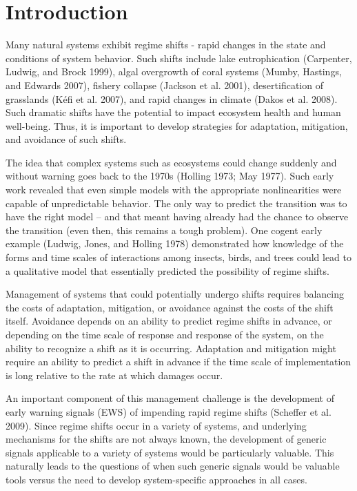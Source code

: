 \documentclass[author-year, review]{elsarticle} %
\begin{document}
\section{Introduction}

Many natural systems exhibit regime shifts - rapid changes in the state
and conditions of system behavior. Such shifts include lake
eutrophication (Carpenter, Ludwig, and Brock 1999), algal overgrowth of
coral systems (Mumby, Hastings, and Edwards 2007), fishery collapse
(Jackson et al. 2001), desertification of grasslands (Kéfi et al. 2007),
and rapid changes in climate (Dakos et al. 2008). Such dramatic shifts
have the potential to impact ecosystem health and human well-being.
Thus, it is important to develop strategies for adaptation, mitigation,
and avoidance of such shifts.

The idea that complex systems such as ecosystems could change suddenly
and without warning goes back to the 1970s (Holling 1973; May 1977).
Such early work revealed that even simple models with the appropriate
nonlinearities were capable of unpredictable behavior. The only way to
predict the transition was to have the right model -- and that meant
having already had the chance to observe the transition (even then, this
remains a tough problem). One cogent early example (Ludwig, Jones, and
Holling 1978) demonstrated how knowledge of the forms and time scales of
interactions among insects, birds, and trees could lead to a qualitative
model that essentially predicted the possibility of regime shifts.

Management of systems that could potentially undergo shifts requires
balancing the costs of adaptation, mitigation, or avoidance against the
costs of the shift itself. Avoidance depends on an ability to predict
regime shifts in advance, or depending on the time scale of response and
response of the system, on the ability to recognize a shift as it is
occurring. Adaptation and mitigation might require an ability to predict
a shift in advance if the time scale of implementation is long relative
to the rate at which damages occur.

An important component of this management challenge is the development
of early warning signals (EWS) of impending rapid regime shifts
(Scheffer et al. 2009). Since regime shifts occur in a variety of
systems, and underlying mechanisms for the shifts are not always known,
the development of generic signals applicable to a variety of systems
would be particularly valuable. This naturally leads to the questions of
when such generic signals would be valuable tools versus the need to
develop system-specific approaches in all cases.
\end{document}
